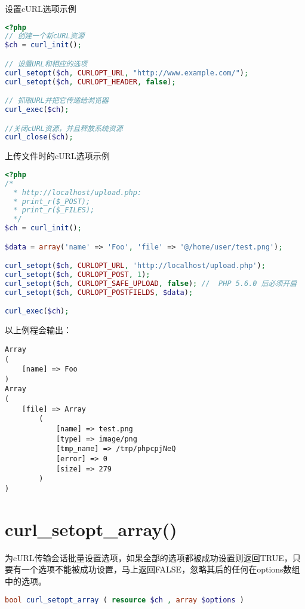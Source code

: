 \begin{example}
设置cURL选项示例
\begin{lstlisting}[language=PHP]
<?php
// 创建一个新cURL资源
$ch = curl_init();

// 设置URL和相应的选项
curl_setopt($ch, CURLOPT_URL, "http://www.example.com/");
curl_setopt($ch, CURLOPT_HEADER, false);

// 抓取URL并把它传递给浏览器
curl_exec($ch);

//关闭cURL资源，并且释放系统资源
curl_close($ch);
\end{lstlisting}
\end{example}




\begin{example}
上传文件时的cURL选项示例
\begin{lstlisting}[language=PHP]
<?php
/* 
  * http://localhost/upload.php:
  * print_r($_POST);
  * print_r($_FILES);
  */
$ch = curl_init();

$data = array('name' => 'Foo', 'file' => '@/home/user/test.png');

curl_setopt($ch, CURLOPT_URL, 'http://localhost/upload.php');
curl_setopt($ch, CURLOPT_POST, 1);
curl_setopt($ch, CURLOPT_SAFE_UPLOAD, false); //  PHP 5.6.0 后必须开启
curl_setopt($ch, CURLOPT_POSTFIELDS, $data);

curl_exec($ch);
\end{lstlisting}
\end{example}

以上例程会输出：

\begin{lstlisting}
Array
(
    [name] => Foo
)
Array
(
    [file] => Array
        (
            [name] => test.png
            [type] => image/png
            [tmp_name] => /tmp/phpcpjNeQ
            [error] => 0
            [size] => 279
        )
)
\end{lstlisting}






\section{curl\_setopt\_array()}

为cURL传输会话批量设置选项，如果全部的选项都被成功设置则返回TRUE，只要有一个选项不能被成功设置，马上返回FALSE，忽略其后的任何在options数组中的选项。



\begin{lstlisting}[language=PHP]
bool curl_setopt_array ( resource $ch , array $options )
\end{lstlisting}

